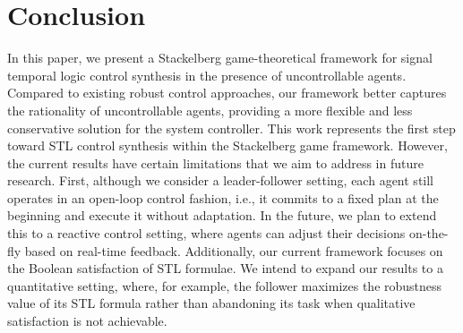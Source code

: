 \documentclass[letterpaper, 10 pt, conference]{ieeeconf}
\begin{document}
\section{Conclusion}\label{sec-conclusion}
%
In this paper, we present a Stackelberg game-theoretical framework for signal temporal logic  control synthesis in the presence of uncontrollable agents. Compared to existing robust control approaches, our framework better captures the rationality of uncontrollable agents, providing a more flexible and less conservative solution for the system controller. This work represents the first step toward STL control synthesis within the Stackelberg game framework. However, the current results have certain limitations that we aim to address in future research. First, although we consider a leader-follower setting, each agent still operates in an open-loop control fashion, i.e.,  it commits to a fixed plan at the beginning and execute it without adaptation. In the future, we plan to extend this to a reactive control setting, where agents can adjust their decisions on-the-fly based on real-time feedback. Additionally, our current framework focuses on the Boolean satisfaction of STL formulae. We intend to expand our results to a quantitative setting, where, for example, the follower maximizes the robustness value of its STL formula rather than abandoning its task when qualitative satisfaction is not achievable. 



\end{document}
